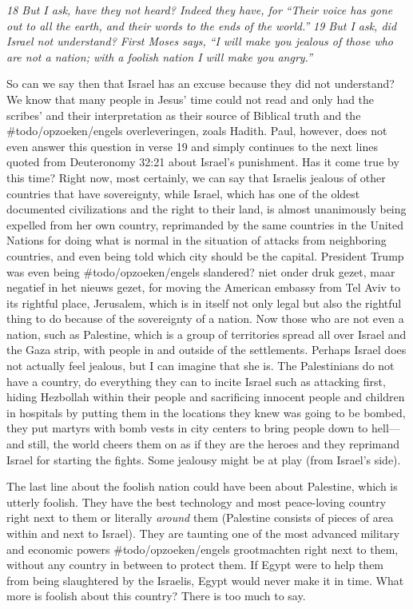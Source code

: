 \emph{18 But I ask, have they not heard? Indeed they have, for}
\emph{``Their voice has gone out to all the earth,\emph{ }and their
words to the ends of the world.''} \emph{19 But I ask, did Israel not
understand? First Moses says,} \emph{``I will make you jealous of those
who are not a nation;\emph{ }with a foolish nation I will make you
angry.''}

So can we say then that Israel has an excuse because they did not
understand? We know that many people in Jesus' time could not read and
only had the scribes' and their interpretation as their source of
Biblical truth and the \#todo/opzoeken/engels overleveringen, zoals
Hadith. Paul, however, does not even answer this question in verse 19
and simply continues to the next lines quoted from Deuteronomy 32:21
about Israel's punishment. Has it come true by this time? Right now,
most certainly, we can say that Israelis jealous of other countries that
have sovereignty, while Israel, which has one of the oldest documented
civilizations and the right to their land, is almost unanimously being
expelled from her own country, reprimanded by the same countries in the
United Nations for doing what is normal in the situation of attacks from
neighboring countries, and even being told which city should be the
capital. President Trump was even being \#todo/opzoeken/engels
slandered? niet onder druk gezet, maar negatief in het nieuws gezet, for
moving the American embassy from Tel Aviv to its rightful place,
Jerusalem, which is in itself not only legal but also the rightful thing
to do because of the sovereignty of a nation. Now those who are not even
a nation, such as Palestine, which is a group of territories spread all
over Israel and the Gaza strip, with people in and outside of the
settlements. Perhaps Israel does not actually feel jealous, but I can
imagine that she is. The Palestinians do not have a country, do
everything they can to incite Israel such as attacking first, hiding
Hezbollah within their people and sacrificing innocent people and
children in hospitals by putting them in the locations they knew was
going to be bombed, they put martyrs with bomb vests in city centers to
bring people down to hell---and still, the world cheers them on as if
they are the heroes and they reprimand Israel for starting the fights.
Some jealousy might be at play (from Israel's side).

The last line about the foolish nation could have been about Palestine,
which is utterly foolish. They have the best technology and most
peace-loving country right next to them or literally \emph{around} them
(Palestine consists of pieces of area within and next to Israel). They
are taunting one of the most advanced military and economic powers
\#todo/opzoeken/engels grootmachten right next to them, without any
country in between to protect them. If Egypt were to help them from
being slaughtered by the Israelis, Egypt would never make it in time.
What more is foolish about this country? There is too much to say.

